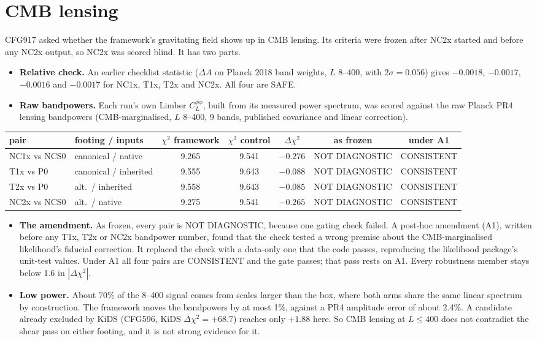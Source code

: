 \documentclass[10pt]{article}
\begin{document}
\section{CMB lensing}
CFG917 asked whether the framework's gravitating field shows up in CMB lensing. Its criteria were frozen after NC2x started and before any NC2x output, so NC2x was scored blind. It has two parts.
\begin{itemize}
\item \textbf{Relative check.} An earlier checklist statistic ($\Delta A$ on Planck 2018 band weights, $L$ 8--400, with $2\sigma=0.056$) gives $-0.0018$, $-0.0017$, $-0.0016$ and $-0.0017$ for NC1x, T1x, T2x and NC2x. All four are SAFE.
\item \textbf{Raw bandpowers.} Each run's own Limber $C_L^{\phi\phi}$, built from its measured power spectrum, was scored against the raw Planck PR4 lensing bandpowers (CMB-marginalised, $L$ 8--400, 9 bands, published covariance and linear correction).
\end{itemize}
\begin{center}\small\setlength{\tabcolsep}{4pt}
\begin{tabular}{llccccc}
\toprule
pair & footing / inputs & $\chi^2$ framework & $\chi^2$ control & $\Delta\chi^2$ & as frozen & under A1\\
\midrule
NC1x vs NCS0 & canonical / native & 9.265 & 9.541 & $-0.276$ & NOT DIAGNOSTIC & CONSISTENT\\
T1x vs P0 & canonical / inherited & 9.555 & 9.643 & $-0.088$ & NOT DIAGNOSTIC & CONSISTENT\\
T2x vs P0 & alt.\ / inherited & 9.558 & 9.643 & $-0.085$ & NOT DIAGNOSTIC & CONSISTENT\\
NC2x vs NCS0 & alt.\ / native & 9.275 & 9.541 & $-0.265$ & NOT DIAGNOSTIC & CONSISTENT\\
\bottomrule
\end{tabular}
\end{center}
\begin{itemize}
\item \textbf{The amendment.} As frozen, every pair is NOT DIAGNOSTIC, because one gating check failed. A post-hoc amendment (A1), written before any T1x, T2x or NC2x bandpower number, found that the check tested a wrong premise about the CMB-marginalised likelihood's fiducial correction. It replaced the check with a data-only one that the code passes, reproducing the likelihood package's unit-test values. Under A1 all four pairs are CONSISTENT and the gate passes; that pass rests on A1. Every robustness member stays below 1.6 in $|\Delta\chi^2|$.
\item \textbf{Low power.} About 70\% of the 8--400 signal comes from scales larger than the box, where both arms share the same linear spectrum by construction. The framework moves the bandpowers by at most 1\%, against a PR4 amplitude error of about 2.4\%. A candidate already excluded by KiDS (CFG596, KiDS $\Delta\chi^2=+68.7$) reaches only $+1.88$ here. So CMB lensing at $L\le400$ does not contradict the shear pass on either footing, and it is not strong evidence for it.
\end{itemize}
\end{document}
